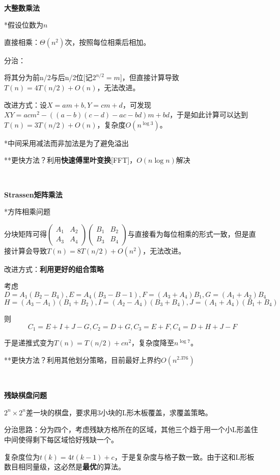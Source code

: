 \documentclass[a4paper,UTF8,fontset=windows]{ctexart}
\begin{document}
\

\textbf{大整数乘法}

*假设位数为$n$

直接相乘：$\Theta(n^2)$次，按照每位相乘后相加。

分治：

将其分为前n/2与后n/2位[记$2^{n/2}=m$]，但直接计算导致$T(n)=4T(n/2)+O(n)$，无法改进。

改进方式：设$X=am+b,Y=cm+d$，可发现$XY=acm^2-((a-b)(c-d)-ac-bd)m+bd$，于是如此计算可以达到$T(n)=3T(n/2)+O(n)$，复杂度$O(n^{\log 3})$。

*\hspace{0em}中间采用减法而非加法是为了避免溢出

**\hspace{0em}更快方法？利用\textbf{快速傅里叶变换}[FFT]，$O(n\log n)$解决

\

\textbf{Strassen矩阵乘法}

*\hspace{0em}方阵相乘问题

分块矩阵可得$\begin{pmatrix}A_1&A_2\\A_3&A_4\end{pmatrix}\begin{pmatrix}B_1&B_2\\B_3&B_4\end{pmatrix}$与直接看为每位相乘的形式一致，但是直接计算会导致$T(n)=8T(n/2)+O(n^2)$，无法改进。

改进方式：\textbf{利用更好的组合策略}

考虑
$$D=A_1(B_2-B_4),E=A_4(B_3-B-1),F=(A_3+A_4)B_1,G=(A_1+A_2)B_4$$
$$H=(A_3-A_1)(B_1+B_2),I=(A_2-A_4)(B_3+B_4),J=(A_1+A_4)(B_1+B_4)$$

则
$$C_1=E+I+J-G,C_2=D+G,C_3=E+F,C_4=D+H+J-F$$

于是递推式变为$T(n)=T(n/2)+cn^2$，复杂度降至$n^{\log7}$。

**\hspace{0em}更快方法？利用其他划分策略，目前最好上界约$O(n^{2.376})$

\

\textbf{残缺棋盘问题}

$2^n\times2^n$差一块的棋盘，要求用3小块的L形木板覆盖，求覆盖策略。

分治思路：分为四个，考虑残缺方格所在的区域，其他三个趋于用一个小L形盖住中间使得剩下每区域恰好残缺一个。

复杂度位为$t(k)=4t(k-1)+c$，于是复杂度与格子数一致。由于这和L形板数目相同量级，这必然是\textbf{最优}的算法。
\end{document}
